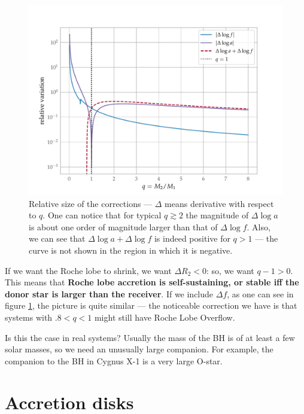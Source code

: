 \documentclass[main.tex]{subfiles}
\begin{document}
\begin{figure}[ht]
\centering
\includegraphics[width=\textwidth]{figures/roche-lobe-relative-corrections.pdf}
\caption{Relative size of the corrections --- \(\Delta \) means derivative with respect to \(q\). One can notice that for typical \(q \gtrsim 2\) the magnitude of \(\Delta \log a\) is about one order of magnitude larger than that of \(\Delta \log f\). Also, we can see that \(\Delta \log a + \Delta \log f\) is indeed positive for \(q > 1\) --- the curve is not shown in the region in which it is negative.}
\label{fig:roche-lobe-relative-corrections}
\end{figure}

If we want the Roche lobe to shrink, we want \(\Delta R_2 < 0\): so, we want \(q - 1 > 0\). 
This means that \textbf{Roche lobe accretion is self-sustaining, or stable iff the donor star is larger than the receiver}. 
If we include \(\Delta f\), as one can see in figure \ref{fig:roche-lobe-relative-corrections}, the picture is quite similar --- the noticeable correction we have is that systems with \(\num{.8} < q < 1\) might still have Roche Lobe Overflow. 

Is this the case in real systems? Usually the mass of the BH is of at least a few solar masses, so we need an unusually large companion. 
For example, the companion to the BH in Cygnus X-1 is a very large O-star. 

\section{Accretion disks}
\end{document}
